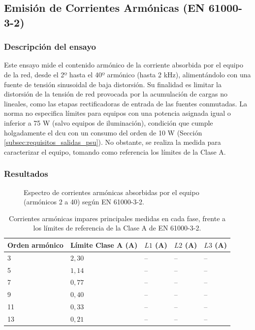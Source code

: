 
\subsection{Emisión de Corrientes Armónicas (EN 61000-3-2)}
\label{subsec:emision_armonicos}

\subsubsection*{Descripción del ensayo}

Este ensayo mide el contenido armónico de la corriente absorbida por el equipo de la red, desde el 2º hasta el 40º armónico (hasta 2 kHz), alimentándolo con una fuente de tensión sinusoidal de baja distorsión. Su finalidad es limitar la distorsión de la tensión de red provocada por la acumulación de cargas no lineales, como las etapas rectificadoras de entrada de las fuentes conmutadas. La norma no especifica límites para equipos con una potencia asignada igual o inferior a 75 W (salvo equipos de iluminación), condición que cumple holgadamente el \gls{dcu} con un consumo del orden de 10 W (Sección \ref{subsec:requisitos_salidas_psu}). No obstante, se realiza la medida para caracterizar el equipo, tomando como referencia los límites de la Clase A.

\subsubsection*{Resultados}

\begin{figure}[htbp]
    \centering
    \caption{Espectro de corrientes armónicas absorbidas por el equipo (armónicos 2 a 40) según EN 61000-3-2.}
    \label{fig:armonicos_corriente}
\end{figure}

\begin{table}[!h]
\centering
\small
\begin{tabular}{|p{2.4cm}|p{3.2cm}|p{2.2cm}|p{2.2cm}|p{2.2cm}|}
\hline
\textbf{Orden armónico} & \textbf{Límite Clase A (A)} & \textbf{$L1$ (A)} & \textbf{$L2$ (A)} & \textbf{$L3$ (A)} \\ \hline
3 & $2,30$ & -- & -- & -- \\ \hline
5 & $1,14$ & -- & -- & -- \\ \hline
7 & $0,77$ & -- & -- & -- \\ \hline
9 & $0,40$ & -- & -- & -- \\ \hline
11 & $0,33$ & -- & -- & -- \\ \hline
13 & $0,21$ & -- & -- & -- \\ \hline
\end{tabular}
\caption{Corrientes armónicas impares principales medidas en cada fase, frente a los límites de referencia de la Clase A de EN 61000-3-2.}
\label{tab:resultados_armonicos}
\end{table}

